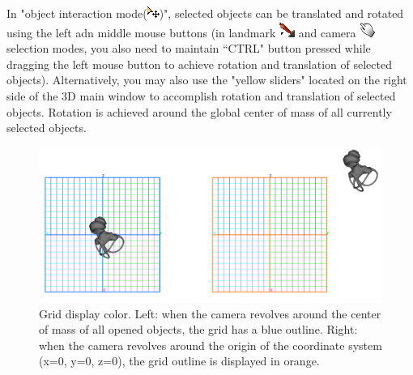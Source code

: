 \documentclass[12pt, a4paper]{book}
\begin{document}
In "object interaction mode(\includegraphics[scale=0.7]{../images/04/move_mode.png})", selected objects can be translated and rotated using the left adn middle mouse buttons (in landmark \includegraphics[scale=0.7]{../images/04/Landmarks2.png} and camera  \includegraphics[scale=0.7]{../images/04/camera_mode.png} selection modes, you also need to maintain ``CTRL" button pressed while dragging the left mouse button to achieve rotation and translation of selected objects). Alternatively, you may also use the "yellow sliders" located on the right side of the 3D main window to accomplish rotation and translation of selected objects. Rotation is achieved around the global center of mass of all currently selected objects.\\
\begin{figure}
  \centering
  \includegraphics[scale=0.3]{grid.png} 
	\caption{Grid display color.  Left: when the camera revolves around the center of mass of all opened objects, the grid has a blue outline. Right: when the camera revolves around the origin of the coordinate system (x=0, y=0, z=0), the grid outline is displayed in orange.}
\label{grid_color}
 
\end{figure}
\end{document}
